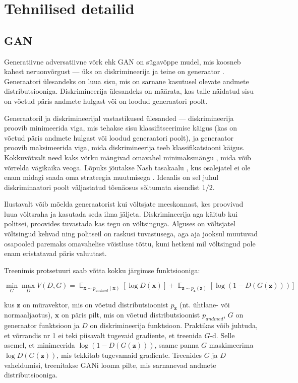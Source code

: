 \documentclass{vilgym}
\DeclareMathOperator{\EX}{\mathbb{E}}
\begin{document}
	\section{Tehnilised detailid}
	\subsection{GAN}
	Generatiivne adversatiivne võrk ehk GAN  on sügavõppe mudel, mis koosneb kahest neruonvõrgust --- üks on diskrimineerija  ja teine on generaator .  Generaatori ülesandeks on luua sisu, mis on sarnane kasutusel olevate andmete distributsiooniga. Diskrimineerija ülesandeks on määrata, kas talle näidatud sisu on võetud päris andmete hulgast või on loodud generaatori poolt.
	
	Generaatoril ja diskrimineerijal vastastikused ülesanded --- diskrimineerija proovib minimeerida viga, mis tehakse sisu klassifitseerimise käigus (kas on võetud päris andmete hulgast või loodud generaatori poolt), ja generaator proovib maksimeerida viga, mida diskrimineerija teeb klassifikatsiooni käigus. Kokkuvõtvalt need kaks võrku mängivad omavahel minimaksmängu , mida võib võrrelda vägikaika veoga. Lõpuks jõutakse Nash tasakaalu , kus osalejatel ei ole enam midagi saada oma strateegia muutmisega \parencite{gametheory}. Ideaalis on sel juhul diskriminaatori poolt väljastatud tõenäosus sõltumata sisendist $ 1/2 $.

	Ilustavalt võib mõelda generaatorist kui võltsjate meeskonnast, kes proovivad luua võltsraha ja kasutada seda ilma jäljeta. Diskrimineerija aga käitub kui politsei, proovides tuvastada kas tegu on võltsinguga. Alguses on võltsjatel võltsingud kehvad ning politseil on raskusi tuvastusega, aga aja jooksul muutuvad osapooled paremaks omavahelise võistluse tõttu, kuni hetkeni mil võltsingud pole enam eristatavad päris valuutast.

	Treenimis protsetuuri saab võtta kokku järgimse funktsiooniga:

	\begin{equation}
		\operatorname*{min}_G \operatorname*{max}_D V(D,G) = \EX_{\boldsymbol{x}\sim p_{andmed}(\boldsymbol{x})}[\log D(\boldsymbol{x})] + \EX_{\boldsymbol{z}\sim p_{\boldsymbol{z}}(\boldsymbol{z})}[\log(1-D(G(\boldsymbol{z})))]
	\end{equation}

	kus $ \boldsymbol{z} $ on müravektor, mis on võetud distributsioonist $ p_{\boldsymbol{z}} $ (nt. ühtlane- või normaaljaotus), $ \boldsymbol{x} $ on päris pilt, mis on võetud distributsioonist $ p_{andmed} $, $ G $ on generaator funktsioon ja $ D $ on diskrimineerija funktsioon. Praktikas võib juhtuda, et võrrandis nr 1 ei teki piisavalt tugevaid gradiente, et treenida $ G $-d. Selle asemel, et minimeerida $ \log (1 - D(G(\boldsymbol{z}))) $, saame panna $ G $ maskimeerima $ \log D(G(\boldsymbol{z})) $, mis tekkitab tugevamaid gradiente. Treenides $ G $ ja $ D $ vaheldumisi, treenitakse GANi looma pilte, mis sarnanevad andmete distributsiooniga. \parencite{gan}
\end{document}
